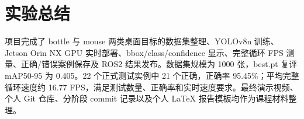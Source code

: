 \documentclass[UTF8,fontset=fandol,a4paper,12pt]{ctexart}
\begin{document}
\section{实验总结}

项目完成了 bottle 与 mouse 两类桌面目标的数据集整理、YOLOv8n 训练、Jetson Orin NX GPU 实时部署、bbox/class/confidence 显示、完整循环 FPS 测量、正确/错误案例保存及 ROS2 结果发布。数据集规模为 1000 张，best.pt 复评 mAP50-95 为 0.405。22 个正式测试实例中 21 个正确，正确率 95.45\%；平均完整循环速度约 16.77 FPS，满足测试数量、正确率和实时速度要求。最终演示视频、个人 Git 仓库、分阶段 commit 记录以及个人 LaTeX 报告模板均作为课程材料整理。
\end{document}

